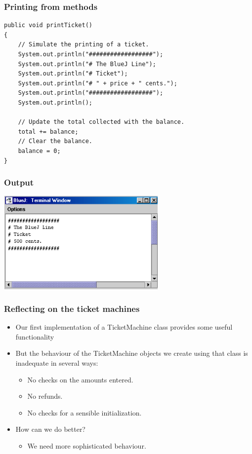 \documentclass{beamer}
\begin{document}
\begin{frame}[fragile]
\frametitle{Printing from methods}
\begin{lstlisting}
public void printTicket()‏
{
    // Simulate the printing of a ticket.
    System.out.println("##################");
    System.out.println("# The BlueJ Line");
    System.out.println("# Ticket");
    System.out.println("# " + price + " cents.");
    System.out.println("##################");
    System.out.println();
 
    // Update the total collected with the balance.
    total += balance;
    // Clear the balance.
    balance = 0;
} 
\end{lstlisting}
\end{frame}

\begin{frame}
\frametitle{Output}
\begin{center}
\includegraphics[height=5cm, keepaspectratio]{./figures/ticketOut}
\end{center}
\end{frame}

\begin{frame}
\frametitle{Reflecting on the ticket machines}
\begin{itemize}
\item Our first implementation of a TicketMachine class provides some useful functionality
\item But the behaviour of the TicketMachine objects we create using that class is inadequate in several ways:
\begin{itemize}
\item No checks on the amounts entered.
\item No refunds.
\item No checks for a sensible initialization.
\end{itemize}
\item How can we do better?
\begin{itemize}
\item We need more sophisticated behaviour.
\end{itemize}
\end{itemize}
\end{frame}
\end{document}
